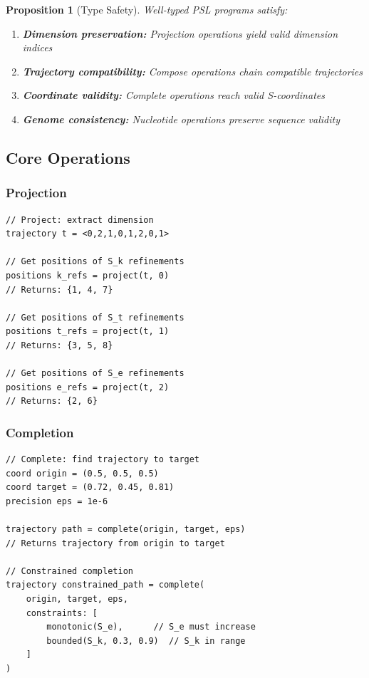 \documentclass[twocolumn,10pt]{article}
\newtheorem{proposition}[theorem]{Proposition}
\theoremstyle{remark}
\begin{document}
\begin{proposition}[Type Safety]
Well-typed PSL programs satisfy:
\begin{enumerate}
\item \textbf{Dimension preservation:} Projection operations yield valid dimension indices
\item \textbf{Trajectory compatibility:} Compose operations chain compatible trajectories
\item \textbf{Coordinate validity:} Complete operations reach valid S-coordinates
\item \textbf{Genome consistency:} Nucleotide operations preserve sequence validity
\end{enumerate}
\end{proposition}

\subsection{Core Operations}

\subsubsection{Projection}
\begin{lstlisting}[style=tritcode]
// Project: extract dimension
trajectory t = <0,2,1,0,1,2,0,1>

// Get positions of S_k refinements
positions k_refs = project(t, 0)
// Returns: {1, 4, 7}

// Get positions of S_t refinements
positions t_refs = project(t, 1)
// Returns: {3, 5, 8}

// Get positions of S_e refinements
positions e_refs = project(t, 2)
// Returns: {2, 6}
\end{lstlisting}

\subsubsection{Completion}
\begin{lstlisting}[style=tritcode]
// Complete: find trajectory to target
coord origin = (0.5, 0.5, 0.5)
coord target = (0.72, 0.45, 0.81)
precision eps = 1e-6

trajectory path = complete(origin, target, eps)
// Returns trajectory from origin to target

// Constrained completion
trajectory constrained_path = complete(
    origin, target, eps,
    constraints: [
        monotonic(S_e),      // S_e must increase
        bounded(S_k, 0.3, 0.9)  // S_k in range
    ]
)
\end{lstlisting}
\end{document}
